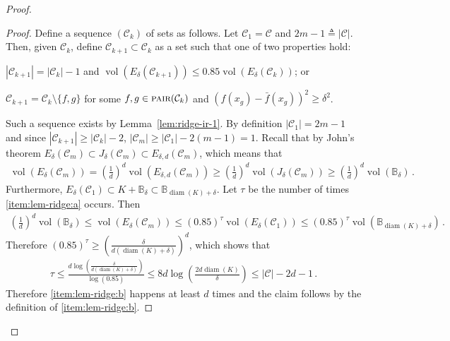\documentclass[letter, 12pt]{report}
\newcommand{\pair}{\operatorname{\textsc{pair}}}
\newcommand{\ball}{\mathbb{B}}
\newcommand{\cC}{\mathcal C}
\newcommand{\vol}{\operatorname{vol}}
\newcommand{\diam}{\operatorname{diam}}
\newcommand{\1}{\mathbf{1}}
\theoremstyle{plain}
\theoremstyle{definition}
\theoremstyle{remark}
\begin{document}
\begin{proof}
    \begin{proof}
        Define a sequence $(\cC_k)$ of sets as follows.
        Let $\cC_1 = \cC$ and $2m-1 \triangleq |\cC|$. Then, given $\cC_k$, define $\cC_{k+1} \subset \cC_k$ as a set such that one of two properties hold:
        \begin{enumroman}
            \item $|\cC_{k+1}| = |\cC_k| - 1$ and $\vol(E_\delta(\cC_{k+1})) \leq 0.85 \vol(E_\delta(\cC_k))$; or \label{item:lem-ridge:a}
            \item $\cC_{k+1} = \cC_k \setminus \{f, g\}$ for some $f, g \in \pair(\cC_k)$ and $(f(x_g) - \bar f(x_g))^2 \geq \delta^2$. \label{item:lem-ridge:b}
        \end{enumroman}
        Such a sequence exists by Lemma~\ref{lem:ridge-ir-1}.
        By definition $|\cC_1| = 2m-1$ and since $|\cC_{k+1}| \geq |\cC_k| - 2$, $|\cC_m| \geq |\cC_1| - 2(m-1) = 1$.
        Recall that by John's theorem $E_\delta(\cC_m) \subset J_\delta(\cC_m) \subset E_{\delta,d}(\cC_m)$, which means that
        \begin{align*}
            \vol(E_\delta(\cC_m))
            = \left(\frac{1}{d}\right)^d \vol(E_{\delta,d}(\cC_m))
            \geq \left(\frac{1}{d}\right)^d \vol(J_\delta(\cC_m))
            \geq \left(\frac{1}{d}\right)^d \vol(\ball_\delta) \,.
        \end{align*}
        Furthermore, $E_\delta(\cC_1) \subset K + \ball_\delta \subset \ball_{\diam(K) + \delta}$.
        Let $\tau$ be the number of times \ref{item:lem-ridge:a} occurs. Then
        \begin{align*}
            \left(\frac{1}{d}\right)^d \vol(\ball_\delta) \leq \vol(E_\delta(\cC_m)) \leq (0.85)^\tau \vol(E_\delta(\cC_1)) \leq (0.85)^\tau \vol(\ball_{\diam(K)+\delta})\,.
        \end{align*}
        Therefore $(0.85)^\tau \geq \left(\frac{\delta}{d(\diam(K) + \delta)}\right)^d$,
        which shows that
        \begin{align*}
            \tau
            \leq \frac{d \log\left(\frac{\delta}{d(\diam(K) + \delta)}\right)}{\log(0.85)}
            \leq 8 d \log\left(\frac{2d \diam(K)}{\delta}\right)
            \leq |\cC| - 2d - 1\,.
        \end{align*}
        Therefore \ref{item:lem-ridge:b} happens at least $d$ times and the claim follows by the definition of \ref{item:lem-ridge:b}.
    \end{proof}


\end{proof}
\end{document}
